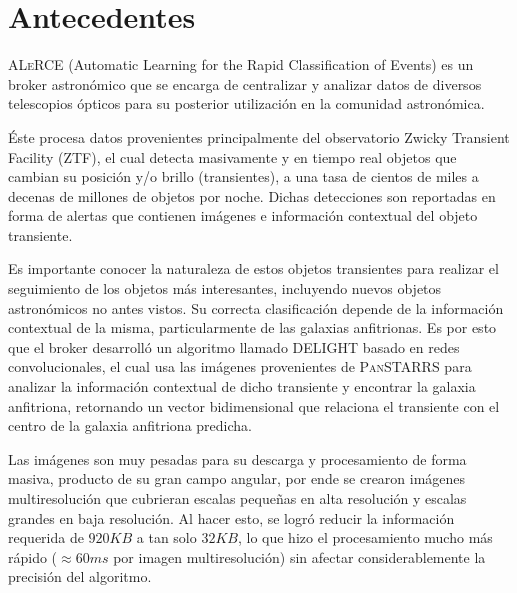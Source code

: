 \documentclass[12pt,a4paper]{article}
\begin{document}


\section{Antecedentes}

\textsc{ALeRCE} (Automatic Learning for the Rapid Classification of Events) es un broker astronómico que se encarga de centralizar y analizar datos de diversos telescopios ópticos para su posterior utilización en la comunidad astronómica.\par\null\par

Éste procesa datos provenientes principalmente del observatorio Zwicky Transient Facility (\textsc{ZTF}), el cual detecta masivamente y en tiempo real objetos que cambian su posición y/o brillo (transientes), a una tasa de cientos de miles a decenas de millones de objetos por noche. Dichas detecciones son reportadas en forma de alertas que contienen imágenes e información contextual del objeto transiente.\par\null\par

Es importante conocer la naturaleza de estos objetos transientes para realizar el seguimiento de los objetos más interesantes, incluyendo nuevos objetos astronómicos no antes vistos. Su correcta clasificación depende de la información contextual de la misma, particularmente de las galaxias anfitrionas. Es por esto que el broker desarrolló un algoritmo llamado DELIGHT \cite{delight} basado en redes convolucionales, el cual usa las imágenes provenientes de \textsc{PanSTARRS} para analizar la información contextual de dicho transiente y encontrar la galaxia anfitriona, retornando un vector bidimensional que relaciona el transiente con el centro de la galaxia anfitriona predicha.\par\null\par

Las imágenes son muy pesadas para su descarga y procesamiento de forma masiva, producto de su gran campo angular, por ende se crearon imágenes multiresolución que cubrieran escalas pequeñas en alta resolución y escalas grandes en baja resolución. Al hacer esto, se logró reducir la información requerida de $920KB$ a tan solo $32KB$, lo que hizo el procesamiento mucho más rápido ($\approx 60 ms$ por imagen multiresolución) sin afectar considerablemente la precisión del algoritmo.\par\null\par
\end{document}
